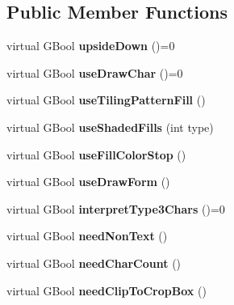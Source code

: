 \subsection*{Public Member Functions}
\begin{DoxyCompactItemize}
\item 
\mbox{\label{class_output_dev_a6f03f8de862d1dfcfeabd8fc9f8c779c}} 
virtual G\+Bool {\bfseries upside\+Down} ()=0
\item 
\mbox{\label{class_output_dev_a0e4c506af59324b094b0433b4612f3af}} 
virtual G\+Bool {\bfseries use\+Draw\+Char} ()=0
\item 
\mbox{\label{class_output_dev_a9272d5990ad2b286ff4ecb627a9843f6}} 
virtual G\+Bool {\bfseries use\+Tiling\+Pattern\+Fill} ()
\item 
\mbox{\label{class_output_dev_a28d7bdc07a55834bf0b2e5a2c87ac907}} 
virtual G\+Bool {\bfseries use\+Shaded\+Fills} (int type)
\item 
\mbox{\label{class_output_dev_a1af7bbf76242dd3a1c970d80a042b025}} 
virtual G\+Bool {\bfseries use\+Fill\+Color\+Stop} ()
\item 
\mbox{\label{class_output_dev_a88a89943e0b1c93eb7e2b68daf263930}} 
virtual G\+Bool {\bfseries use\+Draw\+Form} ()
\item 
\mbox{\label{class_output_dev_aa9681fb6f14963ebfc9fdf3fc1c4ea8e}} 
virtual G\+Bool {\bfseries interpret\+Type3\+Chars} ()=0
\item 
\mbox{\label{class_output_dev_ac22cca1656cfcdc4431c1638ba428cf1}} 
virtual G\+Bool {\bfseries need\+Non\+Text} ()
\item 
\mbox{\label{class_output_dev_aeb6b343278e1bf777afa4eee8eed2ac2}} 
virtual G\+Bool {\bfseries need\+Char\+Count} ()
\item 
\mbox{\label{class_output_dev_a01e321ecf774481f826da5c7cd0a6d3b}} 
virtual G\+Bool {\bfseries need\+Clip\+To\+Crop\+Box} ()
\item 

\end{DoxyCompactItemize}
